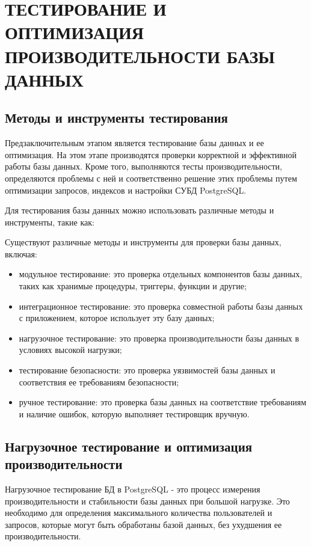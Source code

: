 \section{ТЕСТИРОВАНИЕ И ОПТИМИЗАЦИЯ ПРОИЗВОДИТЕЛЬНОСТИ БАЗЫ ДАННЫХ}

\subsection{Методы и инструменты тестирования}

Предзаключительным этапом является тестирование базы данных и ее оптимизация. На этом этапе производятся проверки корректной и эффективной работы базы данных. Кроме того, выполняются тесты производительности, определяются проблемы с ней и соответственно решение этих проблемы путем оптимизации запросов, индексов и настройки СУБД PostgreSQL.

Для тестирования базы данных можно использовать различные методы и инструменты, такие как:

Существуют различные методы и инструменты для проверки базы данных, включая:

\begin{itemize}
    \item модульное тестирование: это проверка отдельных компонентов базы данных, таких как хранимые процедуры, триггеры, функции и другие;
    \item интеграционное тестирование: это проверка совместной работы базы данных с приложением, которое использует эту базу данных;
    \item нагрузочное тестирование: это проверка производительности базы данных в условиях высокой нагрузки;
    \item тестирование безопасности: это проверка уязвимостей базы данных и соответствия ее требованиям безопасности;
    \item ручное тестирование: это проверка базы данных на соответствие требованиям и наличие ошибок, которую выполняет тестировщик вручную.
\end{itemize}



\subsection{Нагрузочное тестирование и оптимизация производительности}

Нагрузочное тестирование БД в PostgreSQL - это процесс измерения производительности и стабильности базы данных при большой нагрузке. Это необходимо для определения максимального количества пользователей и запросов, которые могут быть обработаны базой данных, без ухудшения ее производительности.

